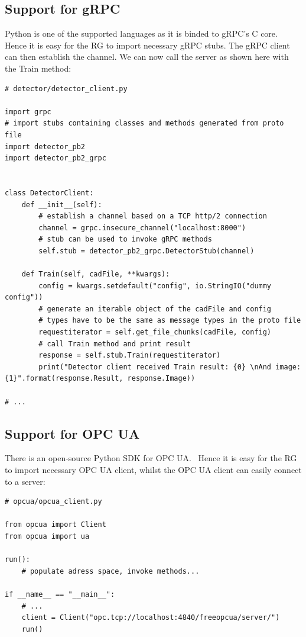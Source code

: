\subsection{Support for gRPC}
\label{sec:grpcpython}
Python is one of the supported languages as it is binded to gRPC's C core.~\cite{gRPC-Documentation2019Last2019} Hence it is easy for the RG to import necessary gRPC stubs. The gRPC client can then establish the channel. We can now call the server as shown here with the Train method:

\begin{verbatim}
# detector/detector_client.py

import grpc
# import stubs containing classes and methods generated from proto file
import detector_pb2
import detector_pb2_grpc


class DetectorClient:
    def __init__(self):
        # establish a channel based on a TCP http/2 connection
        channel = grpc.insecure_channel("localhost:8000")
        # stub can be used to invoke gRPC methods
        self.stub = detector_pb2_grpc.DetectorStub(channel)
    
    def Train(self, cadFile, **kwargs):
        config = kwargs.setdefault("config", io.StringIO("dummy config"))
        # generate an iterable object of the cadFile and config
        # types have to be the same as message types in the proto file
        requestiterator = self.get_file_chunks(cadFile, config)
        # call Train method and print result
        response = self.stub.Train(requestiterator)
        print("Detector client received Train result: {0} \nAnd image: {1}".format(response.Result, response.Image))
        
# ...
\end{verbatim}

\subsection{Support for OPC UA}
There is an open-source Python SDK for OPC UA.~\cite{N.A.OPC2019} Hence it is easy for the RG to import necessary OPC UA client, whilst the OPC UA client can easily connect to a server:
\begin{verbatim}
# opcua/opcua_client.py

from opcua import Client
from opcua import ua

run():
    # populate adress space, invoke methods...

if __name__ == "__main__":
    # ...
    client = Client("opc.tcp://localhost:4840/freeopcua/server/")
    run()
\end{verbatim}

